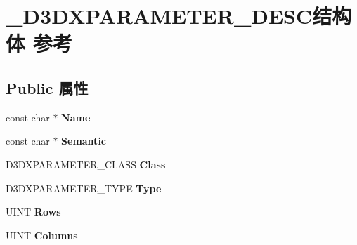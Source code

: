 \hypertarget{struct___d3_d_x_p_a_r_a_m_e_t_e_r___d_e_s_c}{}\section{\+\_\+\+D3\+D\+X\+P\+A\+R\+A\+M\+E\+T\+E\+R\+\_\+\+D\+E\+S\+C结构体 参考}
\label{struct___d3_d_x_p_a_r_a_m_e_t_e_r___d_e_s_c}
\subsection*{Public 属性}
\begin{DoxyCompactItemize}
\item 
\mbox{\label{struct___d3_d_x_p_a_r_a_m_e_t_e_r___d_e_s_c_acda6c5f43b3eecdca9314ddc95dc1ee4}} 
const char $\ast$ {\bfseries Name}
\item 
\mbox{\label{struct___d3_d_x_p_a_r_a_m_e_t_e_r___d_e_s_c_ae3238bf31e72df50970de9d906e80a63}} 
const char $\ast$ {\bfseries Semantic}
\item 
\mbox{\label{struct___d3_d_x_p_a_r_a_m_e_t_e_r___d_e_s_c_a8b0cd8feb8aff676d36a922cfb7fdb00}} 
D3\+D\+X\+P\+A\+R\+A\+M\+E\+T\+E\+R\+\_\+\+C\+L\+A\+SS {\bfseries Class}
\item 
\mbox{\label{struct___d3_d_x_p_a_r_a_m_e_t_e_r___d_e_s_c_a97378ddfa9f791f49420a6beb7722d61}} 
D3\+D\+X\+P\+A\+R\+A\+M\+E\+T\+E\+R\+\_\+\+T\+Y\+PE {\bfseries Type}
\item 
\mbox{\label{struct___d3_d_x_p_a_r_a_m_e_t_e_r___d_e_s_c_a811df4ae1c13331e3fab9b4ad80e1224}} 
U\+I\+NT {\bfseries Rows}
\item 
\mbox{\label{struct___d3_d_x_p_a_r_a_m_e_t_e_r___d_e_s_c_a1c5e3e77726ed6ab76208b678eaf7440}} 
U\+I\+NT {\bfseries Columns}
\item 
\mbox{\label{struct___d3_d_x_p_a_r_a_m_e_t_e_r___d_e_s_c_a62d140a55edfaf7343ad360c19d11460}} 

\end{DoxyCompactItemize}
